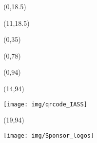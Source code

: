 \documentclass[20pt]{beamer}
\begin{document}
    \begin{frame}

        \begin{textblock}{10.5}(0,18.5)
            
        \end{textblock}

        \begin{textblock}{19}(11,18.5)
            
        \end{textblock}

        \begin{textblock}{30}(0,35)
            
        \end{textblock}

        \begin{textblock}{30}(0,78)
            
        \end{textblock}

        \begin{textblock}{14}(0,94)
            \begin{WhiteBox}
                \vspace{-1cm}
                \begin{block}{}
                    
                    
                \end{block}
            \end{WhiteBox}
        \end{textblock}

        \begin{textblock}{5}(14,94)
            \begin{ClearBox}
                \begin{block}{}
                    \centering
                    \texttt{[image: img/qrcode\_IASS]}
                \end{block}
            \end{ClearBox}
        \end{textblock}

        \begin{textblock}{11}(19,94)
            \begin{WhiteBox}
                \vspace{-1cm}
                \begin{block}{}
                    \texttt{[image: img/Sponsor\_logos]}
                \end{block}
            \end{WhiteBox}
        \end{textblock}
    \end{frame}
\end{document}
